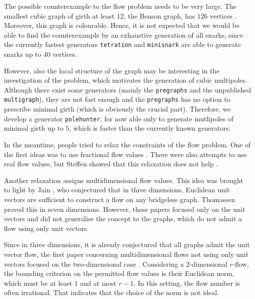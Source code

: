 The possible counterexample to the flow problem needs to be very large. The smallest cubic graph of girth at least $12$, the Benson graph, has $126$ vertices \cite{benson}. Moreover, this graph is colourable. Hence, it is not expected that we would be able to find the counterexample by an exhaustive generation of all snarks, since the currently fastest generators \texttt{tetration} and \texttt{minisnark} \cite{tetration_minisnark} are able to generate snarks up to $40$ vertices.

However, also the local structure of the graph may be interesting in the investigation of the problem, which motivates the generation of cubic multipoles. Although there exist some generators (mainly the \texttt{pregraphs} \cite{pregraph} and the unpublished \texttt{multigraph}), they are not fast enough and the \texttt{pregraphs} has no option to prescribe minimal girth (which is obviously the crucial part). Therefore, we develop a generator \texttt{polehunter}, for now able only to generate mutlipoles of minimal girth up to $5$, which is faster than the currently known generators.

In the meantime, people tried to relax the constraints of the flow problem. One of the first ideas was to use fractional flow values \cite{goddyn_fractional_nzf}. There were also attempts to use real flow values, but Steffen showed that this relaxation does not help \cite{steffen_circular}.

Another relaxation assigns multidimensional flow values. This idea was brought to light by Jain \cite{3d_unit_flows}, who conjectured that in three dimensions, Euclidean unit vectors are sufficient to construct a flow on any bridgeless graph. Thomassen \cite{7d_unit_flows} proved this in seven dimensions. However, these papers focused only on the unit vectors and did not generalise the concept to the graphs, which do not admit a flow using only unit vectors.

Since in three dimensions, it is already conjectured that all graphs admit the unit vector flow, the first paper concerning multidimensional flows not using only unit vectors focused on the two-dimensional case \cite{euclidean_flows}. Considering a $2$-dimensional $r$-flow, the bounding criterion on the permitted flow values is their Euclidean norm, which must be at least $1$ and at most $r-1$. In this setting, the flow number is often irrational. That indicates that the choice of the norm is not ideal.

